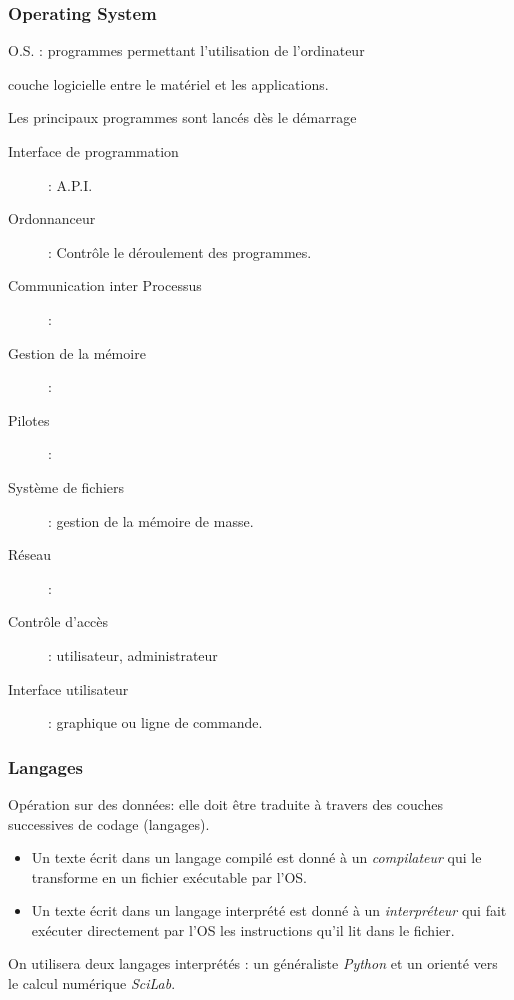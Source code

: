 \begin{frame}
\frametitle{Operating System}
O.S. : programmes permettant l'utilisation de l'ordinateur

couche logicielle entre le matériel et les applications. 

Les principaux programmes sont lancés dès le démarrage
\begin{description}
 \item[Interface de programmation]: A.P.I.
 \item[Ordonnanceur]: Contrôle le déroulement des programmes.
 \item[Communication inter Processus]:
 \item[Gestion de la mémoire]:
 \item[Pilotes]:
 \item[Système de fichiers]: gestion de la mémoire de masse.
 \item[Réseau]:
 \item[Contrôle d'accès]: utilisateur, administrateur
 \item[Interface utilisateur]: graphique ou ligne de commande.
\end{description}
\end{frame}

\begin{frame}
\frametitle{Langages}
Opération sur des données:  elle doit être traduite à travers des couches successives de codage (langages).
\begin{itemize}
 \item Un texte écrit dans un langage compilé est donné à un \emph{compilateur} qui le transforme en un fichier exécutable par l'OS.
 \item Un texte écrit dans un langage interprété est donné à un \emph{interpréteur} qui fait exécuter directement par l'OS les instructions qu'il lit dans le fichier.
\end{itemize}
On utilisera deux langages interprétés : un généraliste \emph{Python} et un orienté vers le calcul numérique \emph{SciLab}.
\end{frame}

